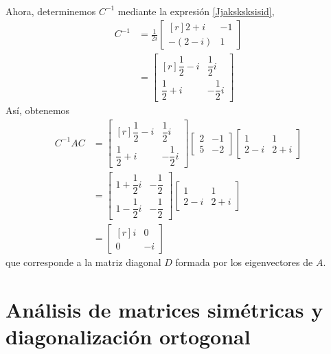 \begin{example}
\begin{align*}
    \end{align*}
    Ahora, determinemos $C^{-1}$ mediante la expresión \ref{Jjaksksksisid},
    \begin{align*}
        C^{-1} & = \frac{1}{2i} \begin{bmatrix*}[r]
            2 + i & - 1 \\
            -(2 - i) & 1
        \end{bmatrix*} \\
        & = \begin{bmatrix*}[r]
            \dfrac{1}{2} - i & \dfrac{1}{2}i \\[2mm]
            \dfrac{1}{2} + i & - \dfrac{1}{2}i
        \end{bmatrix*}
    \end{align*}
    Así, obtenemos
    \begin{align*}
        C^{-1}AC & = \begin{bmatrix*}[r]
            \dfrac{1}{2} - i & \dfrac{1}{2}i \\[2mm]
            \dfrac{1}{2} + i & - \dfrac{1}{2}i
        \end{bmatrix*} \begin{bmatrix*}
            2 & - 1 \\
            5 & - 2
        \end{bmatrix*} \begin{bmatrix}
            1 & 1 \\
            2 - i & 2 + i
        \end{bmatrix} \\
        & = \begin{bmatrix}
            1 + \dfrac{1}{2}i & - \dfrac{1}{2} \\[2mm]
            1 - \dfrac{1}{2}i & - \dfrac{1}{2}
        \end{bmatrix} \begin{bmatrix}
            1 & 1 \\
            2 - i & 2 + i
        \end{bmatrix} \\
        & = \begin{bmatrix*}[r]
            i & 0 \\
            0 & - i
        \end{bmatrix*}
    \end{align*}
    que corresponde a la matriz diagonal $D$ formada por los eigenvectores de $A$.
\end{example}

\section{Análisis de matrices simétricas y diagonalización ortogonal}\label{sec:matrices_sim_her_uni}

